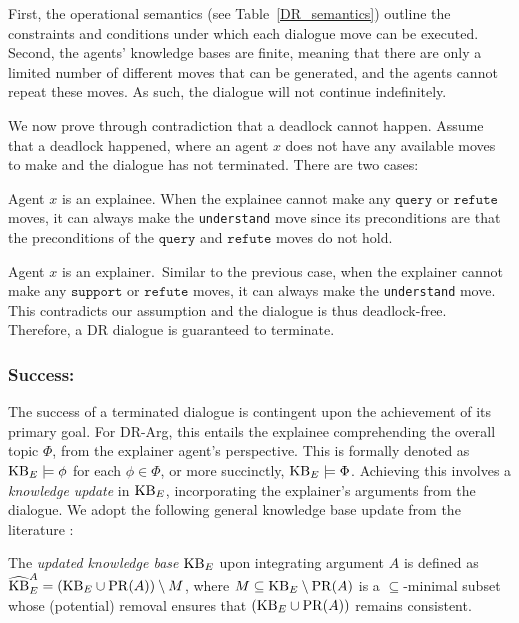 \documentclass{article}
\begin{document}
\begin{sproof}
First, the operational semantics (see Table~\ref{DR_semantics}) outline the constraints and conditions under which each dialogue move can be executed. Second, the agents' knowledge bases are finite, meaning that there are only a limited number of different moves that can be generated, and the agents cannot repeat these moves. As such, the dialogue will not continue indefinitely. 

We now prove through contradiction that a deadlock cannot happen. Assume that a deadlock happened, where an agent $x$ does not have any available moves to make and the dialogue has not terminated. There are two cases:
\squishlist
\item Agent $x$ is an explainee. When the explainee cannot make any $\texttt{query}$ or $\texttt{refute}$ moves, it can always make the \texttt{understand} move since its preconditions are that the preconditions of the $\texttt{query}$ and $\texttt{refute}$ moves do not hold. 
\item Agent $x$ is an explainer.~Similar to the previous case, when the explainer cannot make any $\texttt{support}$ or $\texttt{refute}$ moves, it can always make the \texttt{understand} move.
\squishend
This contradicts our assumption and the dialogue is thus deadlock-free. Therefore, a DR dialogue is guaranteed to terminate.
\end{sproof}


\subsubsection{Success:} The success of a terminated dialogue is contingent upon the achievement of its primary goal. For DR-Arg, this entails the explainee comprehending the overall topic $\Phi$, from the explainer agent's perspective. This is formally denoted as $\mathrm{KB}_E \models \phi$ for each $\phi \in \Phi$, or more succinctly, $\mathrm{KB}_E \models \Phi$. Achieving this involves a \emph{knowledge update} in $\mathrm{KB}_E$, incorporating the explainer's arguments from the dialogue. We adopt the following general knowledge base update from the literature \citep{vasileioulogic}:

\begin{definition}
    The \emph{updated knowledge base} $\mathrm{KB}_E$ upon integrating argument $A$ is defined as $\widehat{\mathrm{KB}}_E^{A} = (\mathrm{KB}_E \cup \mathrm{PR}(A))\setminus M$, where $M \subseteq \mathrm{KB}_E \setminus \mathrm{PR}(A)$ is a $\subseteq$-minimal subset whose (potential) removal ensures that $(\mathrm{KB}_E \cup \mathrm{PR}(A))$ remains consistent.
    \label{def:kb_update}
\end{definition}
\end{document}
